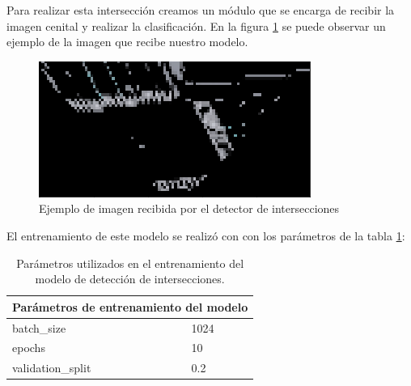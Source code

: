 Para realizar esta intersección creamos un módulo que se encarga de recibir la imagen cenital y realizar la clasificación. En la figura \ref{fig:imgIntersecc} se puede observar un ejemplo de la imagen que recibe nuestro modelo.
\begin{figure}[h!]
    \centering
    \includegraphics[width=0.6\linewidth]{img/intersecImg.png}
    \caption{Ejemplo de imagen recibida por el detector de intersecciones}
    \label{fig:imgIntersecc}
\end{figure}

El entrenamiento de este modelo se realizó con con los parámetros de la tabla \ref{tab:entrenInteresecc}:
\begin{table}[h!]
    \centering
    \begin{tabular}{@{}ll@{}}
    \toprule
    \multicolumn{2}{l}{Parámetros de entrenamiento del modelo} \\ \midrule
    batch\_size                        & 1024                  \\
    epochs                             & 10                    \\
    validation\_split                  & 0.2                   \\ \bottomrule
    \end{tabular}
    \caption{Parámetros utilizados en el entrenamiento del modelo de detección de intersecciones.}
    \label{tab:entrenInteresecc}
\end{table}



